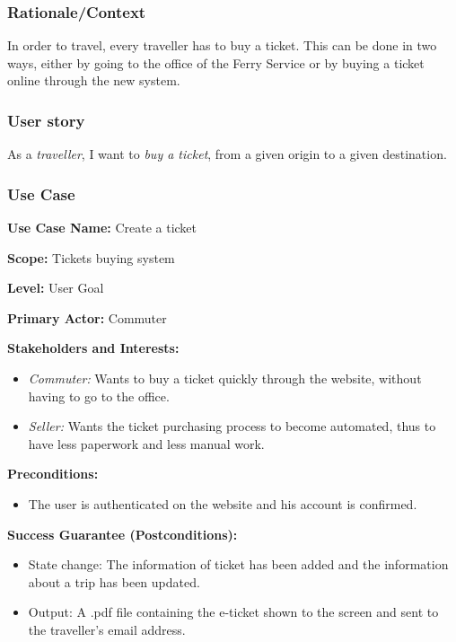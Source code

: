 \subsubsection{Rationale/Context}
In order to travel, every traveller has to buy a ticket. This can be done in two ways, either by going to the office of the Ferry Service or by buying a ticket online through the new system. 
\subsubsection{User story}
As a \textit{traveller}, I want to \textit{buy a ticket}, from a given origin to a given destination.
\subsubsection{Use Case}
\creator{\studentA}
\updater{\studentB}
\secondUpdater{\studentC}

\textbf{Use Case Name:} Create a ticket

\textbf{Scope:} Tickets buying system

\textbf{Level:} User Goal

\textbf{Primary Actor:} Commuter

\textbf{Stakeholders and Interests:} 
\begin{itemize}
\item \textit{Commuter:} Wants to buy a ticket quickly through the website, without having to go to the office.
\item \textit{Seller:} Wants the ticket purchasing process to become automated, thus to have less paperwork and less manual work.
\end{itemize}

\textbf{Preconditions:}
\begin{itemize}
\item The user is authenticated on the website and his account is confirmed.
\end{itemize}

\textbf{Success Guarantee (Postconditions):}
\begin{itemize}
    \item State change: The information of ticket has been added and the information about a trip has been updated.
    \item Output: A .pdf file containing the e-ticket shown to the screen and sent to the traveller's email address.
\end{itemize}

